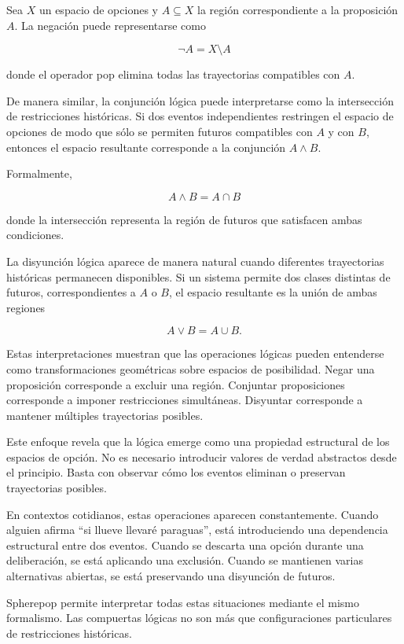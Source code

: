 \documentclass[12pt]{article}
\begin{document}
Sea \(X\) un espacio de opciones y \(A \subseteq X\) la región correspondiente a la proposición \(A\). La negación puede representarse como

\[
\neg A = X \setminus A
\]

donde el operador pop elimina todas las trayectorias compatibles con \(A\).

De manera similar, la conjunción lógica puede interpretarse como la intersección de restricciones históricas. Si dos eventos independientes restringen el espacio de opciones de modo que sólo se permiten futuros compatibles con \(A\) y con \(B\), entonces el espacio resultante corresponde a la conjunción \(A \land B\).

Formalmente,

\[
A \land B = A \cap B
\]

donde la intersección representa la región de futuros que satisfacen ambas condiciones.

La disyunción lógica aparece de manera natural cuando diferentes trayectorias históricas permanecen disponibles. Si un sistema permite dos clases distintas de futuros, correspondientes a \(A\) o \(B\), el espacio resultante es la unión de ambas regiones

\[
A \lor B = A \cup B .
\]

Estas interpretaciones muestran que las operaciones lógicas pueden entenderse como transformaciones geométricas sobre espacios de posibilidad. Negar una proposición corresponde a excluir una región. Conjuntar proposiciones corresponde a imponer restricciones simultáneas. Disyuntar corresponde a mantener múltiples trayectorias posibles.

Este enfoque revela que la lógica emerge como una propiedad estructural de los espacios de opción. No es necesario introducir valores de verdad abstractos desde el principio. Basta con observar cómo los eventos eliminan o preservan trayectorias posibles.

En contextos cotidianos, estas operaciones aparecen constantemente. Cuando alguien afirma ``si llueve llevaré paraguas'', está introduciendo una dependencia estructural entre dos eventos. Cuando se descarta una opción durante una deliberación, se está aplicando una exclusión. Cuando se mantienen varias alternativas abiertas, se está preservando una disyunción de futuros.

Spherepop permite interpretar todas estas situaciones mediante el mismo formalismo. Las compuertas lógicas no son más que configuraciones particulares de restricciones históricas.
\end{document}
